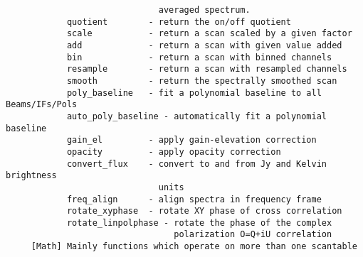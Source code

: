 \documentclass[11pt]{article}
\begin{document}
\begin{verbatim}
                              averaged spectrum.
            quotient        - return the on/off quotient
            scale           - return a scan scaled by a given factor
            add             - return a scan with given value added 
            bin             - return a scan with binned channels
            resample        - return a scan with resampled channels
            smooth          - return the spectrally smoothed scan
            poly_baseline   - fit a polynomial baseline to all Beams/IFs/Pols
            auto_poly_baseline - automatically fit a polynomial baseline 
            gain_el         - apply gain-elevation correction
            opacity         - apply opacity correction
            convert_flux    - convert to and from Jy and Kelvin brightness
                              units
            freq_align      - align spectra in frequency frame
            rotate_xyphase  - rotate XY phase of cross correlation
            rotate_linpolphase - rotate the phase of the complex
                                 polarization O=Q+iU correlation
     [Math] Mainly functions which operate on more than one scantable


\end{verbatim}
\end{document}
